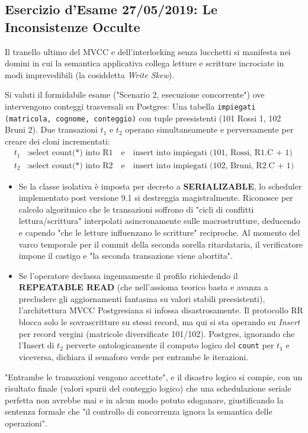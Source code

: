 \subsection{Esercizio d'Esame 27/05/2019: Le Inconsistenze Occulte}
Il tranello ultimo del MVCC e dell'interlocking senza lucchetti si manifesta nei domini in cui la semantica applicativa collega letture e scritture incrociate in modi imprevedibili (la cosiddetta \textit{Write Skew}).

Si valuti il formidabile esame ("Scenario 2, esecuzione concorrente") ove intervengono conteggi trasversali su Postgres:
Una tabella \texttt{impiegati (matricola, cognome, conteggio)} con tuple preesistenti (101 Rossi 1, 102 Bruni 2).
Due transazioni $t_1$ e $t_2$ operano simultaneamente e perversamente per creare dei cloni incrementati:
\begin{align*}
    t_1&: \text{select count(*) into R1} \quad \text{e} \quad \text{insert into impiegati (101, Rossi, R1.C + 1)} \\
    t_2&: \text{select count(*) into R2} \quad \text{e} \quad \text{insert into impiegati (102, Bruni, R2.C + 1)}
\end{align*}

\begin{itemize}
    \item Se la classe isolativa è imposta per decreto a \textbf{SERIALIZABLE}, lo scheduler implementato post versione 9.1 si destreggia magistralmente. Riconosce per calcolo algoritmico che le transazioni soffrono di "cicli di conflitti lettura/scrittura" interpolati asincronamente sulle macrostrutture, deducendo e capendo "che le letture influenzano le scritture" reciproche. Al momento del varco temporale per il commit della seconda sorella ritardataria, il verificatore impone il castigo e "la seconda transazione viene abortita".
    \item Se l'operatore declassa ingenuamente il profilo richiedendo il \textbf{REPEATABLE READ} (che nell'assioma teorico basta e avanza a precludere gli aggiornamenti fantasma su valori stabili preesistenti), l'architettura MVCC Postgresiana si infossa disastrosamente. Il protocollo RR blocca solo le sovrascritture su stessi record, ma qui si sta operando su \textit{Insert} per record vergini (matricole diversificate 101/102). Postgres, ignorando che l'Insert di $t_2$ perverte ontologicamente il computo logico del \texttt{count} per $t_1$ e viceversa, dichiara il semaforo verde per entrambe le iterazioni.
\end{itemize}
"Entrambe le transazioni vengono accettate", e il disastro logico si compie, con un risultato finale (valori spurii del conteggio logico) che una schedulazione seriale perfetta non avrebbe mai e in alcun modo potuto sdoganare, giustificando la sentenza formale che "il controllo di concorrenza ignora la semantica delle operazioni".
